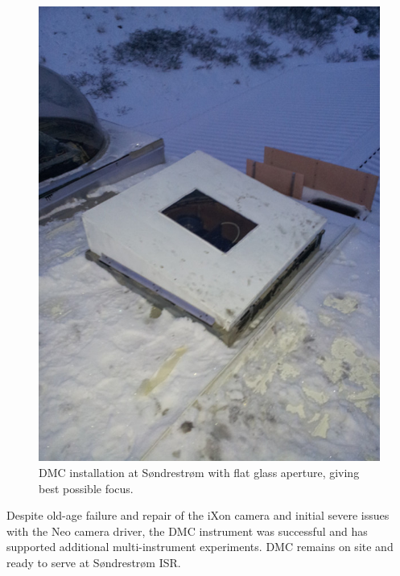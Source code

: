 \begin{figure}\centering
	\includegraphics[width=\linewidth,trim=0 200 0 200,clip]{gfx/DMC-opening}
	\caption{DMC installation at Søndrestrøm with flat glass aperture, giving best possible focus.}
	\label{fig:dmcflat}
\end{figure}
Despite old-age failure and repair of the iXon camera and initial severe issues with the Neo camera driver, the DMC instrument was successful and has supported additional multi-instrument experiments.
DMC remains on site and ready to serve at Søndrestrøm ISR.


\FloatBarrier
